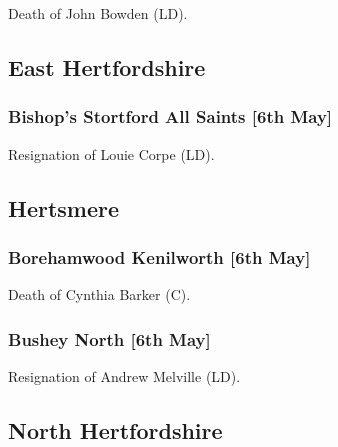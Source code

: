 \documentclass[a4paper,openany]{book}
\begin{document}
\begin{resultsiii}

Death of John Bowden (LD).

\subsection*{East Hertfordshire}

\subsubsection*{Bishop's Stortford All Saints \hspace*{\fill}\nolinebreak[1]%
	\enspace\hspace*{\fill}
	[6th May]}


Resignation of Louie Corpe (LD).

\subsection*{Hertsmere}

\subsubsection*{Borehamwood Kenilworth \hspace*{\fill}\nolinebreak[1]%
	\enspace\hspace*{\fill}
	[6th May]}


Death of Cynthia Barker (C).

\subsubsection*{Bushey North \hspace*{\fill}\nolinebreak[1]%
	\enspace\hspace*{\fill}
	[6th May]}


Resignation of Andrew Melville (LD).

\subsection*{North Hertfordshire}


\end{resultsiii}
\end{document}
